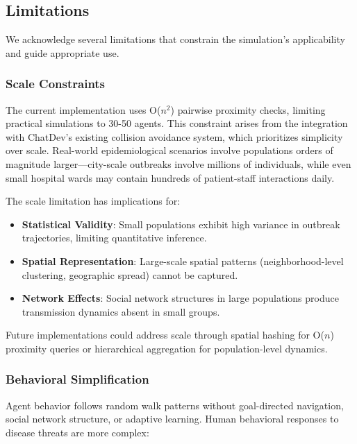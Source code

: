 \subsection{Limitations}

We acknowledge several limitations that constrain the simulation's applicability and guide appropriate use.

\subsubsection{Scale Constraints}

The current implementation uses O($n^2$) pairwise proximity checks, limiting practical simulations to 30-50 agents. This constraint arises from the integration with ChatDev's existing collision avoidance system, which prioritizes simplicity over scale. Real-world epidemiological scenarios involve populations orders of magnitude larger---city-scale outbreaks involve millions of individuals, while even small hospital wards may contain hundreds of patient-staff interactions daily.

The scale limitation has implications for:
\begin{itemize}
    \item \textbf{Statistical Validity}: Small populations exhibit high variance in outbreak trajectories, limiting quantitative inference.
    \item \textbf{Spatial Representation}: Large-scale spatial patterns (neighborhood-level clustering, geographic spread) cannot be captured.
    \item \textbf{Network Effects}: Social network structures in large populations produce transmission dynamics absent in small groups.
\end{itemize}

Future implementations could address scale through spatial hashing for O($n$) proximity queries or hierarchical aggregation for population-level dynamics.

\subsubsection{Behavioral Simplification}

Agent behavior follows random walk patterns without goal-directed navigation, social network structure, or adaptive learning. Human behavioral responses to disease threats are more complex:

